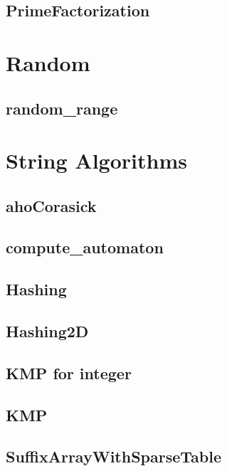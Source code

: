 ﻿\documentclass[10pt,twocolumn]{article}
\newcommand{\codefile}[1]{}}
\begin{document}
\subsection{PrimeFactorization}
\codefile{Number Theory/PrimeFactorization.cpp}

\section{Random}
\subsection{random\_range}
\codefile{Random/random_range.cpp}

\section{String Algorithms}
\subsection{ahoCorasick}
\codefile{Strings/ahoCorasick.cpp}

\subsection{compute\_automaton}
\codefile{Strings/compute_automaton.cpp}

\subsection{Hashing}
\codefile{Strings/Hashing.cpp}

\subsection{Hashing2D}
\codefile{Strings/Hashing2D.cpp}

\subsection{KMP for integer}
\codefile{Strings/KMP for integer.cpp}

\subsection{KMP}
\codefile{Strings/KMP.cpp}

\subsection{SuffixArrayWithSparseTable}
\codefile{Strings/SuffixArrayWithSparseTable.cpp}
\end{document}
